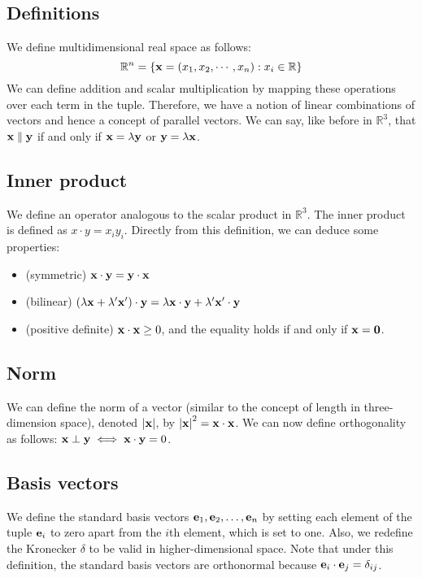 \subsection{Definitions}
We define multidimensional real space as follows:
\[
	\mathbb R^n = \{ \vb x = (x_1, x_2, \cdots, x_n) : x_i \in \mathbb R \}
\]
We can define addition and scalar multiplication by mapping these operations over each term in the tuple.
Therefore, we have a notion of linear combinations of vectors and hence a concept of parallel vectors.
We can say, like before in \(\mathbb R^3\), that \(\vb x \parallel \vb y\) if and only if \(\vb x = \lambda \vb y\) or \(\vb y = \lambda \vb x\).

\subsection{Inner product}
We define an operator analogous to the scalar product in \(\mathbb R^3\).
The inner product is defined as \(x \cdot y = x_i y_i\).
Directly from this definition, we can deduce some properties:
\begin{itemize}
	\item (symmetric) \(\vb x \cdot \vb y = \vb y \cdot \vb x\)
	\item (bilinear) \((\lambda \vb x + \lambda'\vb x')\cdot \vb y = \lambda \vb x\cdot \vb y + \lambda' \vb x' \cdot \vb y\)
	\item (positive definite) \(\vb x \cdot \vb x \geq 0\), and the equality holds if and only if \(\vb x = \vb 0\).
\end{itemize}

\subsection{Norm}
We can define the norm of a vector (similar to the concept of length in three-dimension space), denoted \(\abs {\vb x}\), by \(\abs{\vb x}^2 = \vb x \cdot \vb x\).
We can now define orthogonality as follows: \(\vb x \perp \vb y \iff \vb x \cdot \vb y = 0\).

\subsection{Basis vectors}
We define the standard basis vectors \(\vb e_1, \vb e_2, \dots, \vb e_n\) by setting each element of the tuple \(\vb e_i\) to zero apart from the \(i\)th element, which is set to one.
Also, we redefine the Kronecker \(\delta\) to be valid in higher-dimensional space.
Note that under this definition, the standard basis vectors are orthonormal because \(\vb e_i \cdot \vb e_j = \delta_{ij}\).

